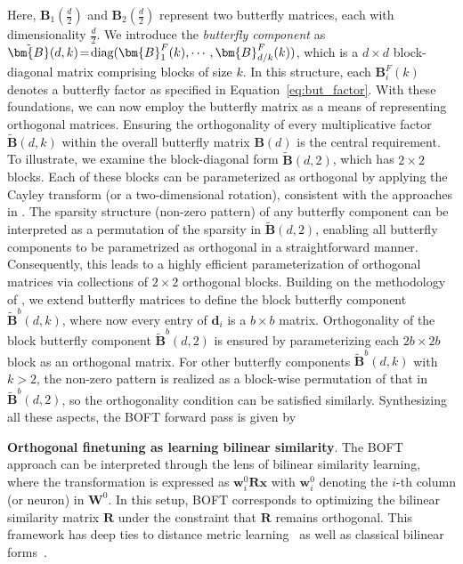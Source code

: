 Here, $\bm{B}_1(\frac{d}{2})$ and $\bm{B}_2(\frac{d}{2})$ represent two butterfly matrices, each with dimensionality $\frac{d}{2}$. We introduce the \emph{butterfly component} as $\thickmuskip=2mu \medmuskip=2mu \tilde{\bm{B}}(d,k)=\text{diag}(\bm{B}^F_1(k),\cdots,\bm{B}^F_{d/k}(k))$, which is a $d\times d$ block-diagonal matrix comprising blocks of size $k$. In this structure, each $\bm{B}^F_i(k)$ denotes a butterfly factor as specified in Equation~\ref{eq:but_factor}. With these foundations, we can now employ the butterfly matrix as a means of representing orthogonal matrices. Ensuring the orthogonality of every multiplicative factor $\tilde{\bm{B}}(d,k)$ within the overall butterfly matrix $\bm{B}(d)$ is the central requirement. To illustrate, we examine the block-diagonal form $\tilde{\bm{B}}(d,2)$, which has $2\times2$ blocks. Each of these blocks can be parameterized as orthogonal by applying the Cayley transform (or a two-dimensional rotation), consistent with the approaches in \cite{liu2021orthogonal,qiu2023controlling}. The sparsity structure (non-zero pattern) of any butterfly component can be interpreted as a permutation of the sparsity in $\tilde{\bm{B}}(d,2)$, enabling all butterfly components to be parametrized as orthogonal in a straightforward manner. Consequently, this leads to a highly efficient parameterization of orthogonal matrices via collections of $2\times 2$ orthogonal blocks. Building on the methodology of \cite{chen2022pixelated}, we extend butterfly matrices to define the block butterfly component $\tilde{\bm{B}}^b(d,k)$, where now every entry of $\bm{d}_i$ is a $b\times b$ matrix. Orthogonality of the block butterfly component $\tilde{\bm{B}}^b(d,2)$ is ensured by parameterizing each $2b\times 2b$ block as an orthogonal matrix. For other butterfly components $\tilde{\bm{B}}^b(d,k)$ with $k>2$, the non-zero pattern is realized as a block-wise permutation of that in $\tilde{\bm{B}}^b(d,2)$, so the orthogonality condition can be satisfied similarly. Synthesizing all these aspects, the BOFT forward pass is given by

\textbf{Orthogonal finetuning as learning bilinear similarity}. The BOFT approach can be interpreted through the lens of bilinear similarity learning, where the transformation is expressed as $\bm{w}^0_i\bm{R}\bm{x}$ with $\bm{w}^0_i$ denoting the $i$-th column (or neuron) in $\bm{W}^0$. In this setup, BOFT corresponds to optimizing the bilinear similarity matrix $\bm{R}$ under the constraint that $\bm{R}$ remains orthogonal. This framework has deep ties to distance metric learning~\cite{xing2002distance} as well as classical bilinear forms~\cite{roman2005advanced}.

